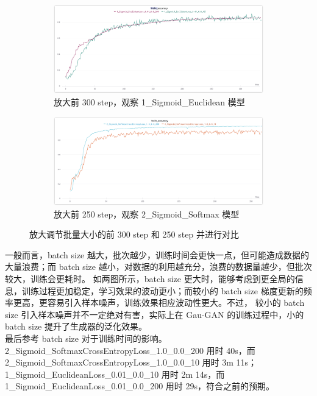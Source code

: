 \documentclass{article}
\begin{document}
\begin{figure}[htbp]
	\flushleft
	\centering
	\begin{subfigure}{0.475\textwidth}
		\centering
		\includegraphics[width=1\textwidth]{../pics/学习率放大1.jpg}
		\caption{放大前 300 step，观察 1\_Sigmoid\_Euclidean 模型}
		\label{fig:13a}
	\end{subfigure}
	\begin{subfigure}{0.475\textwidth}
		\centering
		\includegraphics[width=1\textwidth]{../pics/学习率放大2.jpg}
		\caption{放大前 250 step，观察 2\_Sigmoid\_Softmax 模型}
		\label{fig:13b}
	\end{subfigure}
	\caption{放大调节批量大小的前 300 step 和 250 step 并进行对比}
	\label{fig:13}
\end{figure}

一般而言，batch size 越大，批次越少，训练时间会更快一点，但可能造成数据的大量浪费；而 batch size 越小，对数据的利用越充分，浪费的数据量越少，但批次较大，训练会更耗时。
如两图所示，batch size 更大时，能够考虑到更全局的信息，训练过程更加稳定，学习效果的波动更小；而较小的 batch size 梯度更新的频率更高，更容易引入样本噪声，训练效果相应波动性更大。不过，
较小的 batch size 引入样本噪声并不一定绝对有害，实际上在 Gau-GAN 的训练过程中，小的 batch size 提升了生成器的泛化效果。\\
最后参考 batch size 对于训练时间的影响。2\_Sigmoid\_SoftmaxCrossEntropyLoss\_1.0\_0.0\_200 用时 40s，而 2\_Sigmoid\_SoftmaxCrossEntropyLoss\_1.0\_0.0\_10 用时 3m 11s；
1\_Sigmoid\_EuclideanLoss\_0.01\_0.0\_10 用时 2m 14s，而 1\_Sigmoid\_EuclideanLoss\_0.01\_0.0\_200 用时 29s，符合之前的预期。
\end{document}
